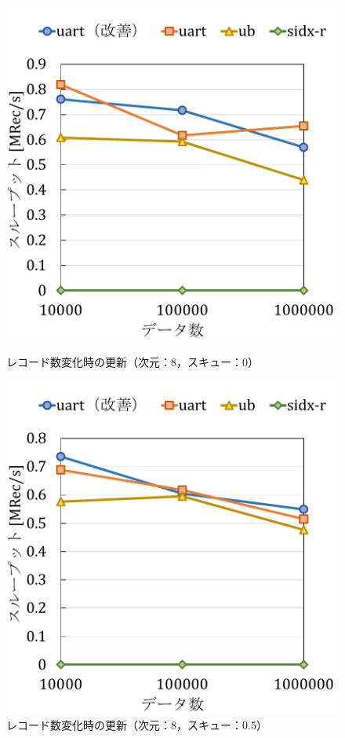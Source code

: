 \begin{figure}[tb]
  \begin{minipage}[c]{0.495\textwidth}
    \centering
    \includegraphics[scale=0.45]{./figures/graph-record-update-8-0.pdf}
    \caption{レコード数変化時の更新（次元：8，スキュー：0）}
    \label{graph:rec-upd-8-0}
  \end{minipage}
  \begin{minipage}[c]{0.495\textwidth}
    \centering
    \includegraphics[scale=0.45]{./figures/graph-record-update-8-0.5.pdf}
    \caption{レコード数変化時の更新（次元：8，スキュー：0.5）}
    \label{graph:rec-upd-8-0.5}
  \end{minipage}
\end{figure}


